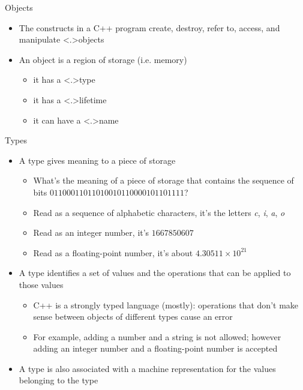 \begin{frame}{Objects}

  \begin{itemize}[<+->]
  \item The constructs in a C++ program create, destroy, refer to, access,
    and manipulate \alert<.>{objects}
  \item An object is a region of storage (i.e. memory)
    \begin{itemize}[<+->]
    \item it has a \alert<.>{type}
    \item it has a \alert<.>{lifetime}
    \item it can have a \alert<.>{name}
    \end{itemize}
  \end{itemize}

\end{frame}

\begin{frame}{Types}

  \begin{itemize}[<+->]
  \item A type gives meaning to a piece of storage
    \begin{itemize}
    \item What's the meaning of a piece of storage that contains the sequence of
      bits $01100011011010010110000101101111$?
    \item Read as a sequence of alphabetic characters, it's the letters
      \textit{c}, \textit{i}, \textit{a}, \textit{o}
    \item Read as an integer number, it's $1667850607$
    \item Read as a floating-point number, it's about $4.30511 \times 10^{21}$
    \end{itemize}
  \item A type identifies a set of values and the operations that can be applied
    to those values
    \begin{itemize}
    \item C++ is a \alert{strongly typed} language (mostly): operations that
      don't make sense between objects of different types cause an error
    \item For example, adding a number and a string is not allowed; however
      adding an integer number and a floating-point number is accepted
    \end{itemize}
  \item A type is also associated with a machine representation for the values
    belonging to the type
  \end{itemize}

\end{frame}

